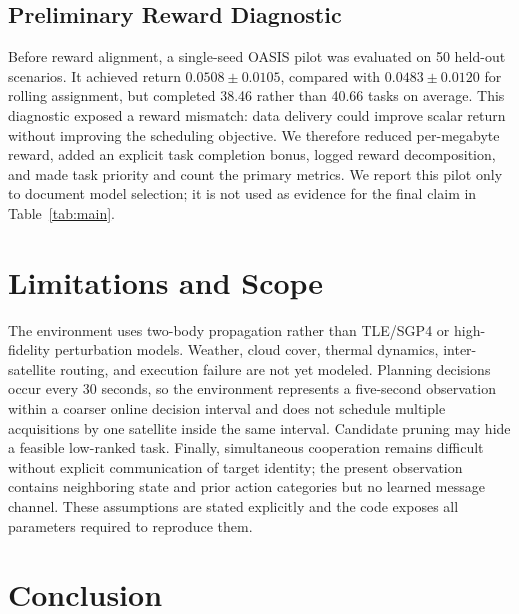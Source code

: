 \documentclass[letterpaper]{article}
\begin{document}
\subsection{Preliminary Reward Diagnostic}

Before reward alignment, a single-seed OASIS pilot was evaluated on 50 held-out scenarios.  It achieved return $0.0508\pm0.0105$, compared with $0.0483\pm0.0120$ for rolling assignment, but completed 38.46 rather than 40.66 tasks on average.  This diagnostic exposed a reward mismatch: data delivery could improve scalar return without improving the scheduling objective.  We therefore reduced per-megabyte reward, added an explicit task completion bonus, logged reward decomposition, and made task priority and count the primary metrics.  We report this pilot only to document model selection; it is not used as evidence for the final claim in Table~\ref{tab:main}.


\section{Limitations and Scope}

The environment uses two-body propagation rather than TLE/SGP4 or high-fidelity perturbation models.  Weather, cloud cover, thermal dynamics, inter-satellite routing, and execution failure are not yet modeled.  Planning decisions occur every 30 seconds, so the environment represents a five-second observation within a coarser online decision interval and does not schedule multiple acquisitions by one satellite inside the same interval.  Candidate pruning may hide a feasible low-ranked task.  Finally, simultaneous cooperation remains difficult without explicit communication of target identity; the present observation contains neighboring state and prior action categories but no learned message channel.  These assumptions are stated explicitly and the code exposes all parameters required to reproduce them.

\section{Conclusion}
\end{document}
